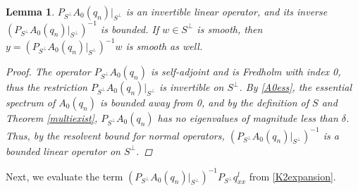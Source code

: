 \documentclass[12pt]{article}
\newtheorem{lemma}{Lemma}
\begin{document}
\begin{lemma}\label{PA0inv}
$P_{S^\perp} A_0(q_n) |_{S^\perp}$ is an invertible linear operator, and its inverse $(P_{S^\perp} A_0(q_n) |_{S^\perp})^{-1}$ is bounded. If $w \in S^\perp$ is smooth, then $y = (P_{S^\perp} A_0(q_n)|_{S^\perp})^{-1} w$ is smooth as well.

\begin{proof}
The operator $P_{S^\perp} A_0(q_n)$ is self-adjoint and is Fredholm with index 0, thus the restriction $P_{S^\perp} A_0(q_n)|_{S^\perp}$ is invertible on $S^\perp$. By \eqref{A0ess}, the essential spectrum of $A_0(q_n)$ is bounded away from 0, and by the definition of $S$ and Theorem \ref{multiexist}, $P_{S^\perp} A_0(q_n)$ has no eigenvalues of magnitude less than $\delta$. Thus, by the resolvent bound for normal operators, $(P_{S^\perp} A_0(q_n)|_{S^\perp})^{-1}$ is a bounded linear operator on $S^\perp$. 
\end{proof}
\end{lemma}

Next, we evaluate the term $(P_{S^\perp} A_0(q_n)|_{S^\perp})^{-1} P_{S^\perp} q^l_{xx}$ from \eqref{K2expansion}.

\end{document}

